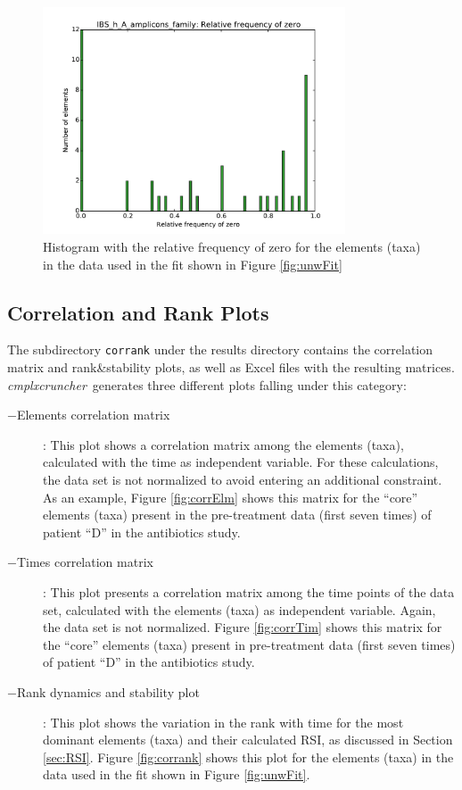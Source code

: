 \documentclass[12pt,oneside,letterpaper]{article}
\newcommand{\CC}[0]{\emph{cmplxcruncher}}
\begin{document}
\begin{figure}
	\centering
	\includegraphics[width=0.8\textwidth]{results/hist/IBS_h_A_amplicons_family_ZRFhist.pdf}
	\caption{Histogram with the relative frequency of zero for the elements (taxa) in the data used in the fit shown in Figure \ref{fig:unwFit}}
	\label{fig:histZRF}
\end{figure}

\subsection{Correlation and Rank Plots} 
The subdirectory \texttt{corrank} under the results directory contains the correlation matrix and rank\&stability plots, as well as Excel files with the resulting matrices. \CC\ generates three different plots falling under this category:
\begin{description}
	\item[$-$Elements correlation matrix]: This plot shows a correlation matrix among the elements (taxa), calculated with the time as independent variable. For these calculations, the data set is not normalized to avoid entering an additional constraint. As an example, Figure \ref{fig:corrElm} shows this matrix for the ``core'' elements (taxa) present in the pre-treatment data (first seven times) of patient ``D'' in the antibiotics study\cite{antibiotic}. 
	\item[$-$Times correlation matrix]: This plot presents a correlation matrix among the time points of the data set, calculated with the elements (taxa) as independent variable. Again, the data set is not normalized. Figure \ref{fig:corrTim} shows this matrix for the ``core'' elements (taxa) present in pre-treatment data (first seven times) of patient ``D'' in the antibiotics study\cite{antibiotic}. 
	\item[$-$Rank dynamics and stability plot]: This plot shows the variation in the rank with time for the most dominant elements (taxa) and their calculated RSI, as discussed in Section \ref{sec:RSI}. Figure \ref{fig:corrank} shows this plot for the elements (taxa) in the data used in the fit shown in Figure \ref{fig:unwFit}.
\end{description}
\end{document}
